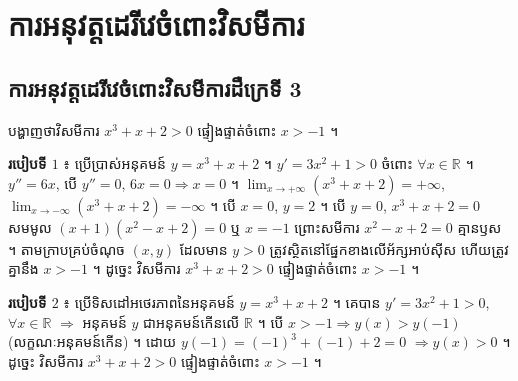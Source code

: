 \section{ការអនុវត្តដេរីវេចំពោះវិសមីការ}
\subsection{ការអនុវត្តដេរីវេចំពោះវិសមីការដឺក្រេទី 3}

\begin{example}[ឧទាហរណ៍]
បង្ហាញថាវិសមីការ $x^3 + x + 2 > 0$ ផ្ទៀងផ្ទាត់ចំពោះ $x > -1$ ។
\end{example}
\textbf{របៀបទី $1$} ៖ ប្រើប្រាស់អនុគមន៍ $y = x^3 + x + 2$ ។ $y' = 3x^2 + 1 > 0$ ចំពោះ $\forall x \in \mathbb{R}$ ។ $y'' = 6x$, បើ $y'' = 0$, $6x = 0 \Rightarrow x = 0$ ។ $\displaystyle\lim_{x \to +\infty}(x^3 + x + 2) = +\infty$, $\displaystyle\lim_{x \to -\infty}(x^3 + x + 2) = -\infty$ ។ បើ $x = 0$, $y = 2$ ។ បើ $y = 0$, $x^3 + x + 2 = 0$ សមមូល $(x + 1)(x^2 - x + 2) = 0$ ឬ $x = -1$ ព្រោះសមីការ $x^2 - x + 2 = 0$ គ្មានឫស ។ តាមក្រាបគ្រប់ចំណុច $(x, y)$ ដែលមាន $y > 0$ ត្រូវស្ថិតនៅផ្នែកខាងលើអ័ក្សអាប់ស៊ីស ហើយត្រូវគ្នានឹង $x > -1$ ។ ដូច្នេះ វិសមីការ $x^3 + x + 2 > 0$ ផ្ទៀងផ្ទាត់ចំពោះ $x > -1$ ។

\begin{center}
\end{center}

\textbf{របៀបទី $2$} ៖ ប្រើទិសដៅអថេរភាពនៃអនុគមន៍ $y = x^3 + x + 2$ ។ គេបាន $y' = 3x^2 + 1 > 0$, $\forall x \in \mathbb{R}$ $\Rightarrow$ អនុគមន៍ $y$ ជាអនុគមន៍កើនលើ $\mathbb{R}$ ។ បើ $x > -1 \Rightarrow y(x) > y(-1)$ (លក្ខណៈអនុគមន៍កើន) ។ ដោយ $y(-1) = (-1)^3 + (-1) + 2 = 0$ $\Rightarrow y(x) > 0$ ។ ដូច្នេះ វិសមីការ $x^3 + x + 2 > 0$ ផ្ទៀងផ្ទាត់ចំពោះ $x > -1$ ។


